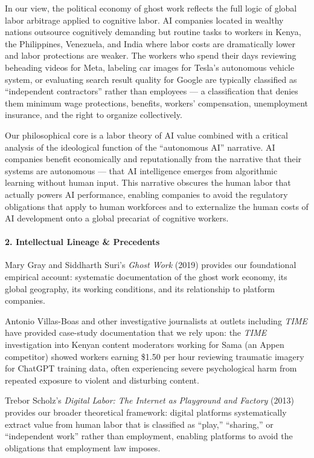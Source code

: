 In our view, the political economy of ghost work reflects the full logic
of global labor arbitrage applied to cognitive labor. AI companies
located in wealthy nations outsource cognitively demanding but routine
tasks to workers in Kenya, the Philippines, Venezuela, and India where
labor costs are dramatically lower and labor protections are weaker. The
workers who spend their days reviewing beheading videos for Meta,
labeling car images for Tesla's autonomous vehicle system, or evaluating
search result quality for Google are typically classified as
``independent contractors'' rather than employees --- a classification
that denies them minimum wage protections, benefits, workers'
compensation, unemployment insurance, and the right to organize
collectively.

Our philosophical core is a labor theory of AI value combined with a
critical analysis of the ideological function of the ``autonomous AI''
narrative. AI companies benefit economically and reputationally from the
narrative that their systems are autonomous --- that AI intelligence
emerges from algorithmic learning without human input. This narrative
obscures the human labor that actually powers AI performance, enabling
companies to avoid the regulatory obligations that apply to human
workforces and to externalize the human costs of AI development onto a
global precariat of cognitive workers.

\paragraph{2. Intellectual Lineage \&
Precedents}\label{intellectual-lineage-precedents-41}

Mary Gray and Siddharth Suri's \emph{Ghost Work} (2019) provides our
foundational empirical account: systematic documentation of the ghost
work economy, its global geography, its working conditions, and its
relationship to platform companies.

Antonio Villas-Boas and other investigative journalists at outlets
including \emph{TIME} have provided case-study documentation that we
rely upon: the \emph{TIME} investigation into Kenyan content moderators
working for Sama (an Appen competitor) showed workers earning \$1.50 per
hour reviewing traumatic imagery for ChatGPT training data, often
experiencing severe psychological harm from repeated exposure to violent
and disturbing content.

Trebor Scholz's \emph{Digital Labor: The Internet as Playground and
Factory} (2013) provides our broader theoretical framework: digital
platforms systematically extract value from human labor that is
classified as ``play,'' ``sharing,'' or ``independent work'' rather than
employment, enabling platforms to avoid the obligations that employment
law imposes.

